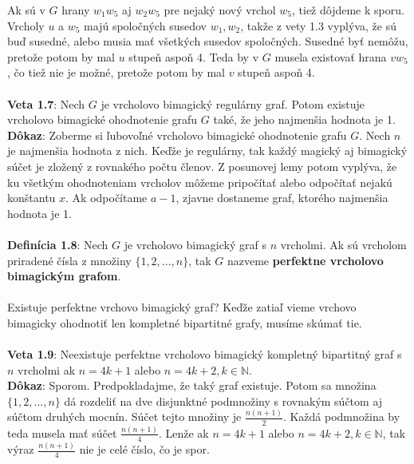 \documentclass[12pt]{article}
\begin{document}
Ak sú v $G$ hrany $w_1 w_5$ aj $w_2 w_5$ pre nejaký nový vrchol $w_5$, tiež dôjdeme k sporu. Vrcholy $u$ a $w_5$ majú spoločných susedov $w_1, w_2$, takže z vety 1.3 vyplýva, že sú buď susedné, alebo musia mať všetkých susedov spoločných. Susedné byť nemôžu, pretože potom by mal $u$ stupeň aspoň 4. Teda by v $G$ musela existovať hrana $v w_5$, čo tiež nie je možné, pretože potom by mal $v$ stupeň aspoň 4. \\\\

\textbf{Veta 1.7}: Nech $G$ je vrcholovo bimagický regulárny graf. Potom existuje vrcholovo bimagické ohodnotenie grafu $G$ také, že jeho najmenšia hodnota je 1. \\

\textbf{Dôkaz}: Zoberme si ľubovoľné vrcholovo bimagické ohodnotenie grafu $G$. Nech $n$ je najmenšia hodnota z nich. Keďže je regulárny, tak každý magický aj bimagický súčet je zložený z rovnakého počtu členov. Z posunovej lemy potom vyplýva, že ku všetkým ohodnoteniam vrcholov môžeme pripočítať alebo odpočítať nejakú konštantu $x$. Ak odpočítame $a-1$, zjavne dostaneme graf, ktorého najmenšia hodnota je 1. \\\\

\textbf{Definícia 1.8}: Nech $G$ je vrcholovo bimagický graf s $n$ vrcholmi. Ak sú vrcholom priradené čísla z množiny $\{1, 2, ... , n\}$, tak $G$ nazveme \textbf{perfektne vrcholovo bimagickým grafom}. \\\\

Existuje perfektne vrchovo bimagický graf? Keďže zatiaľ vieme vrchovo bimagicky ohodnotiť len kompletné bipartitné grafy, musíme skúmať tie. \\\\

\textbf{Veta 1.9}: Neexistuje perfektne vrcholovo bimagický kompletný bipartitný graf s $n$ vrcholmi ak $n = 4k+1$ alebo $n = 4k+2, k \in \mathbb{N}$. \\

\textbf{Dôkaz}: Sporom. Predpokladajme, že taký graf existuje. Potom sa množina $\{1, 2, ... , n\}$ dá rozdeliť na dve disjunktné podmnožiny s rovnakým súčtom aj súčtom druhých mocnín. Súčet tejto množiny je $\frac{n(n+1)}{2}$. Každá podmnožina by teda musela mať súčet $\frac{n(n+1)}{4}$. Lenže ak  $n = 4k+1$ alebo $n = 4k+2, k \in \mathbb{N}$, tak výraz $\frac{n(n+1)}{4}$ nie je celé číslo, čo je spor. \\\\
\end{document}
